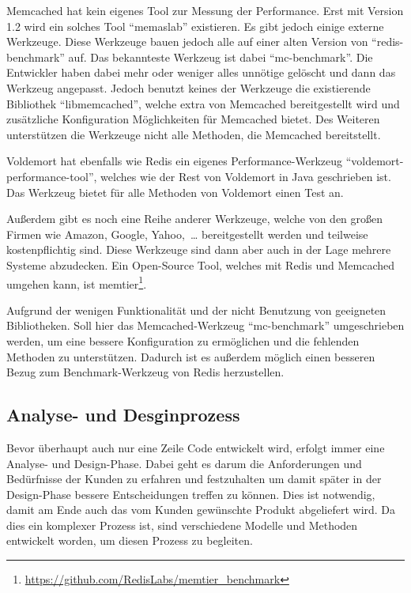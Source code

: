 Memcached hat kein eigenes Tool zur Messung der Performance. Erst mit Version
1.2 wird ein solches Tool \enquote{memaslab} existieren. Es gibt jedoch einige
externe Werkzeuge. Diese Werkzeuge bauen jedoch alle auf einer alten Version von
\enquote{redis-benchmark} auf. Das bekannteste Werkzeug ist dabei
\enquote{mc-benchmark}. Die Entwickler haben dabei mehr oder weniger alles
unnötige gelöscht und dann das Werkzeug angepasst. Jedoch benutzt keines der
Werkzeuge die existierende Bibliothek \enquote{libmemcached}, welche extra von
Memcached bereitgestellt wird und zusätzliche Konfiguration Möglichkeiten für
Memcached bietet. Des Weiteren unterstützen die Werkzeuge nicht alle Methoden,
die Memcached bereitstellt.

Voldemort hat ebenfalls wie Redis ein eigenes Performance-Werkzeug
\enquote{voldemort-performance-tool}, welches wie der Rest von Voldemort in Java
geschrieben ist. Das Werkzeug bietet für alle Methoden von Voldemort einen
Test an.

Außerdem gibt es noch eine Reihe anderer Werkzeuge, welche von den großen
Firmen wie Amazon, Google, Yahoo,~\dots{} bereitgestellt werden und teilweise
kostenpflichtig sind. Diese Werkzeuge sind dann aber auch in der Lage mehrere
Systeme abzudecken. Ein Open-Source Tool, welches mit Redis und Memcached
umgehen kann, ist
memtier\footnote{\url{https://github.com/RedisLabs/memtier_benchmark}}.

Aufgrund der wenigen Funktionalität und der nicht Benutzung von geeigneten
Bibliotheken. Soll hier das Memcached-Werkzeug \enquote{mc-benchmark}
umgeschrieben werden, um eine bessere Konfiguration zu ermöglichen und die
fehlenden Methoden zu unterstützen. Dadurch ist es außerdem möglich einen
besseren Bezug zum Benchmark-Werkzeug von Redis herzustellen.

\subsection{Analyse- und Desginprozess}
Bevor überhaupt auch nur eine Zeile Code entwickelt wird, erfolgt immer eine
Analyse- und Design-Phase. Dabei geht es darum die Anforderungen und Bedürfnisse
der Kunden zu erfahren und festzuhalten um damit später in der Design-Phase
bessere Entscheidungen treffen zu können. Dies ist notwendig, damit am Ende auch
das vom Kunden gewünschte Produkt abgeliefert wird. Da dies ein komplexer
Prozess ist, sind verschiedene Modelle und Methoden entwickelt worden, um diesen
Prozess zu begleiten.

